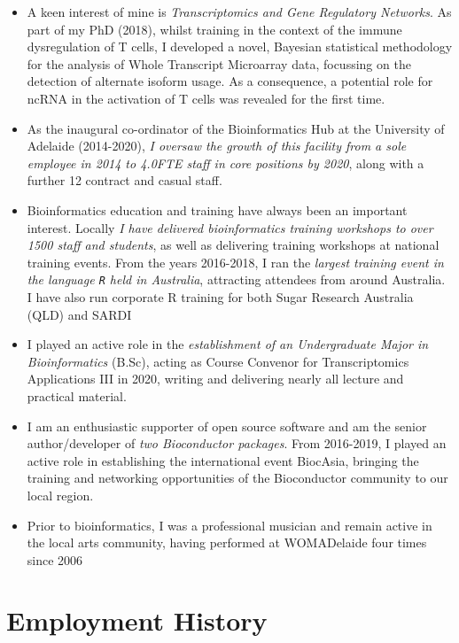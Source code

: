 \documentclass[11pt,a4paper,]{moderncv}
\providecommand{\tightlist}{%
	\setlength{\itemsep}{0pt}\setlength{\parskip}{0pt}}
\begin{document}
\begin{itemize}
\tightlist
\item
  A keen interest of mine is \emph{Transcriptomics and Gene Regulatory
  Networks}. As part of my PhD (2018), whilst training in the context of
  the immune dysregulation of T cells, I developed a novel, Bayesian
  statistical methodology for the analysis of Whole Transcript
  Microarray data, focussing on the detection of alternate isoform
  usage. As a consequence, a potential role for ncRNA in the activation
  of T cells was revealed for the first time.
\item
  As the inaugural co-ordinator of the Bioinformatics Hub at the
  University of Adelaide (2014-2020), \emph{I oversaw the growth of this
  facility from a sole employee in 2014 to 4.0FTE staff in core
  positions by 2020}, along with a further 12 contract and casual staff.
\item
  Bioinformatics education and training have always been an important
  interest. Locally \emph{I have delivered bioinformatics training
  workshops to over 1500 staff and students}, as well as delivering
  training workshops at national training events. From the years
  2016-2018, I ran the \emph{largest training event in the language
  \texttt{R} held in Australia}, attracting attendees from around
  Australia. I have also run corporate R training for both Sugar
  Research Australia (QLD) and SARDI
\item
  I played an active role in the \emph{establishment of an Undergraduate
  Major in Bioinformatics} (B.Sc), acting as Course Convenor for
  Transcriptomics Applications III in 2020, writing and delivering
  nearly all lecture and practical material.
\item
  I am an enthusiastic supporter of open source software and am the
  senior author/developer of \emph{two Bioconductor packages}. From
  2016-2019, I played an active role in establishing the international
  event BiocAsia, bringing the training and networking opportunities of
  the Bioconductor community to our local region.
\item
  Prior to bioinformatics, I was a professional musician and remain
  active in the local arts community, having performed at WOMADelaide
  four times since 2006
\end{itemize}

\small

\hypertarget{employment-history}{%
\section{Employment History}\label{employment-history}}
\end{document}
